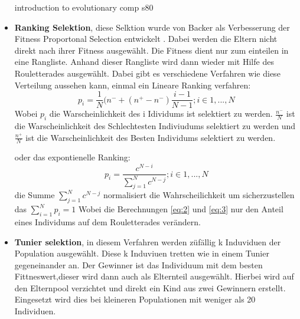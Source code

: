 \begin{itemize}
introduction to evolutionary comp s80
\fi




\item \textbf{Ranking Selektion}, diese Selktion wurde von Backer als Verbesserung der Fitness Proportonal Selection entwickelt \cite{baker1985adaptive}. Dabei werden die Eltern nicht direkt nach ihrer Fitness ausgewählt. Die Fitness dient nur zum einteilen in eine Rangliste. Anhand dieser Rangliste wird dann wieder mit Hilfe des Rouletterades ausgewählt. Dabei gibt es verschiedene Verfahren wie diese Verteilung aussehen kann, einmal ein Lineare Ranking verfahren:
\begin{equation}	
	p_i = \frac{1}{N}(n^- + (n^+ - n^- ) \frac{i-1}{N-1}; i\in{1,...,N} \label{eq:2}
\end{equation}
Wobei $p_i$ die Warscheinlichkeit des i Idividums ist selektiert zu werden. $\frac{n^-}{N}$ ist die Warscheinlichkeit des Schlechtesten Indiviudums selektiert zu werden und  $\frac{n^+}{N}$ ist die Warscheinlichkeit des Besten Individums selektiert zu werden.

oder das expontienelle Ranking:
\begin{equation}
	p_i = \frac{c^{N-i}}{\sum_{j=1}^N c^{N-j}}; i\in{1,...,N} \label{eq:3}
\end{equation}
die Summe $\sum_{j=1}^N c^{N-j}$ normalisiert die Wahrscheilichkeit um sicherzustellen das $\sum_{i=1}^N p_i = 1$
Wobei die Berechnungen \ref{eq:2} und \ref{eq:3} nur den Anteil eines Individums auf dem Rouletterades verändern.

\item \textbf{Tunier selektion}, in diesem Verfahren werden züfällig k Induviduen der Population ausgewählt. Diese k Induviuen  tretten wie in einem Tunier gegeneinander an. Der Gewinner ist das Individuum mit dem besten Fittneswert,dieser wird dann auch als Elternteil ausgewählt. Hierbei wird auf den Elternpool verzichtet und direkt ein Kind aus zwei Gewinnern erstellt. Eingesetzt wird dies bei kleineren Populationen mit weniger als 20 Individuen.


\end{itemize}
